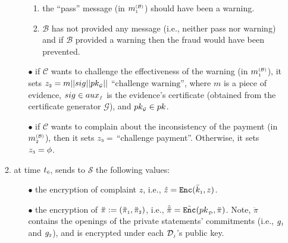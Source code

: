 \begin{enumerate}
\begin{enumerate}
\begin{itemize}
 \begin{enumerate}[label=(\roman*)]
  \item the ``pass'' message (in $m^{\scriptscriptstyle\mathcal{(B)}}_{\scriptscriptstyle 1}$)  should have been a warning.
  
 \item $\mathcal{B}$ has not provided any message (i.e., neither pass nor warning)   and if $\mathcal{B}$  provided a warning  then  the fraud would have been  prevented.  
 

   \end{enumerate}
   \item [$\bullet$] if $\mathcal{C}$ wants to challenge the effectiveness of the warning (in $m^{\scriptscriptstyle\mathcal{(B)}}_{\scriptscriptstyle 1}$),  it sets $z_{\scriptscriptstyle 2}= m||sig||pk_{\scriptscriptstyle\mathcal{G}}||$ $\text{``challenge warning''}$, where  $m$ is a piece of evidence,   $sig\in aux_{\scriptscriptstyle f}$ is the evidence's  certificate (obtained from the certificate generator $\mathcal{G}$), and $pk_{\scriptscriptstyle\mathcal{G}}\in pk$.  
 

  \item [$\bullet$] if $\mathcal{C}$ wants to complain about the inconsistency of the payment (in $m^{\scriptscriptstyle\mathcal{(B)}}_{\scriptscriptstyle 2}$), then it sets  $z_{\scriptscriptstyle 3} =$ ``challenge payment''. Otherwise, it sets $
z_{\scriptscriptstyle 3}=\phi $.

    \end{itemize}
    \item at time $t_{\scriptscriptstyle 6}$, sends to $\mathcal{S}$ the following values: 
    
    \begin{itemize}
     \item[$\bullet$] the encryption of complaint $z$, i.e.,   $\hat z= \mathtt{Enc}(\bar k_{\scriptscriptstyle 1}, z)$.
     \item[$\bullet$] the encryption of $\ddot{\pi}:=(\ddot{\pi}_{\scriptscriptstyle 1}, \ddot{\pi}_{\scriptscriptstyle 2})$, i.e., $\hat{\ddot \pi}={\tilde{\mathtt{Enc}}}({pk}_{\scriptscriptstyle\mathcal {D}}, \ddot \pi)$. Note, $\ddot \pi$ contains the openings of the private statements' commitments (i.e., $g_{\scriptscriptstyle 1}$ and $g_{\scriptscriptstyle 2}$), and is encrypted under each $\mathcal{D}_{\scriptscriptstyle j}$'s public key. 
     \end{itemize}
\end{enumerate}





\end{enumerate}
